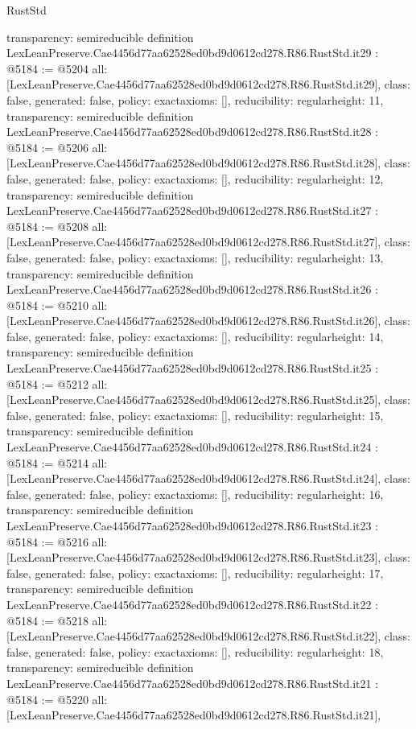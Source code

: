 \begin{lexlean}{RustStd}
\begin{coremodule}
{  transparency: semireducible
}
definition LexLeanPreserve.Cae4456d77aa62528ed0bd9d0612cd278.R86.RustStd.it29 : @5184 := @5204 {
  all: [LexLeanPreserve.Cae4456d77aa62528ed0bd9d0612cd278.R86.RustStd.it29],
  class: false,
  generated: false,
  policy: exact{axioms: []},
  reducibility: regular{height: 11},
  transparency: semireducible
}
definition LexLeanPreserve.Cae4456d77aa62528ed0bd9d0612cd278.R86.RustStd.it28 : @5184 := @5206 {
  all: [LexLeanPreserve.Cae4456d77aa62528ed0bd9d0612cd278.R86.RustStd.it28],
  class: false,
  generated: false,
  policy: exact{axioms: []},
  reducibility: regular{height: 12},
  transparency: semireducible
}
definition LexLeanPreserve.Cae4456d77aa62528ed0bd9d0612cd278.R86.RustStd.it27 : @5184 := @5208 {
  all: [LexLeanPreserve.Cae4456d77aa62528ed0bd9d0612cd278.R86.RustStd.it27],
  class: false,
  generated: false,
  policy: exact{axioms: []},
  reducibility: regular{height: 13},
  transparency: semireducible
}
definition LexLeanPreserve.Cae4456d77aa62528ed0bd9d0612cd278.R86.RustStd.it26 : @5184 := @5210 {
  all: [LexLeanPreserve.Cae4456d77aa62528ed0bd9d0612cd278.R86.RustStd.it26],
  class: false,
  generated: false,
  policy: exact{axioms: []},
  reducibility: regular{height: 14},
  transparency: semireducible
}
definition LexLeanPreserve.Cae4456d77aa62528ed0bd9d0612cd278.R86.RustStd.it25 : @5184 := @5212 {
  all: [LexLeanPreserve.Cae4456d77aa62528ed0bd9d0612cd278.R86.RustStd.it25],
  class: false,
  generated: false,
  policy: exact{axioms: []},
  reducibility: regular{height: 15},
  transparency: semireducible
}
definition LexLeanPreserve.Cae4456d77aa62528ed0bd9d0612cd278.R86.RustStd.it24 : @5184 := @5214 {
  all: [LexLeanPreserve.Cae4456d77aa62528ed0bd9d0612cd278.R86.RustStd.it24],
  class: false,
  generated: false,
  policy: exact{axioms: []},
  reducibility: regular{height: 16},
  transparency: semireducible
}
definition LexLeanPreserve.Cae4456d77aa62528ed0bd9d0612cd278.R86.RustStd.it23 : @5184 := @5216 {
  all: [LexLeanPreserve.Cae4456d77aa62528ed0bd9d0612cd278.R86.RustStd.it23],
  class: false,
  generated: false,
  policy: exact{axioms: []},
  reducibility: regular{height: 17},
  transparency: semireducible
}
definition LexLeanPreserve.Cae4456d77aa62528ed0bd9d0612cd278.R86.RustStd.it22 : @5184 := @5218 {
  all: [LexLeanPreserve.Cae4456d77aa62528ed0bd9d0612cd278.R86.RustStd.it22],
  class: false,
  generated: false,
  policy: exact{axioms: []},
  reducibility: regular{height: 18},
  transparency: semireducible
}
definition LexLeanPreserve.Cae4456d77aa62528ed0bd9d0612cd278.R86.RustStd.it21 : @5184 := @5220 {
  all: [LexLeanPreserve.Cae4456d77aa62528ed0bd9d0612cd278.R86.RustStd.it21],
}
\end{coremodule}
\end{lexlean}
